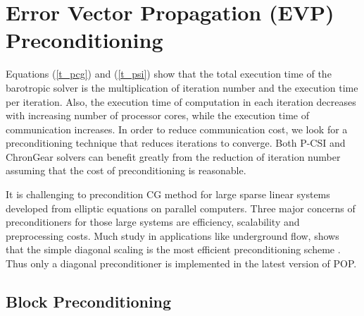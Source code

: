 \section{Error Vector Propagation (EVP) Preconditioning} \label{se:evp}
Equations (\ref{t_pcg}) and (\ref{t_psi}) show that the total execution time of the barotropic solver is the multiplication of
iteration number and the execution time per iteration.
Also, the execution time of computation in each iteration decreases with increasing number of processor cores, while the execution time of communication increases.
In order to reduce communication cost, we look for a preconditioning technique that reduces iterations to converge. 
Both P-CSI and ChronGear solvers can benefit greatly from the reduction of iteration number assuming that the cost of preconditioning is reasonable. 

It is challenging to precondition CG method for large sparse linear systems developed from elliptic equations on parallel computers. 
Three major concerns of preconditioners for those large systems are efficiency, scalability and preprocessing costs. 
Much study in applications like underground flow, shows that the simple diagonal scaling 
is the most efficient preconditioning scheme \cite{pini1990simple, reddy2013comparison}.
Thus only a diagonal preconditioner is implemented in the latest version of POP.




\subsection{Block Preconditioning}

